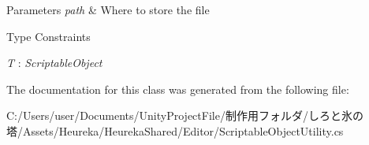 \begin{DoxyParams}{Parameters}
{\em path} & Where to store the file\\
\hline
\end{DoxyParams}
\begin{Desc}
\item[Type Constraints]\begin{description}
\item[{\em T} : {\em Scriptable\+Object}]\end{description}
\end{Desc}


The documentation for this class was generated from the following file\+:\begin{DoxyCompactItemize}
\item 
C\+:/\+Users/user/\+Documents/\+Unity\+Project\+File/制作用フォルダ/しろと氷の塔/\+Assets/\+Heureka/\+Heureka\+Shared/\+Editor/Scriptable\+Object\+Utility.\+cs\end{DoxyCompactItemize}
